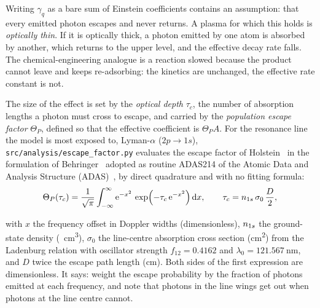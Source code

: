 Writing $\gamma_q$ as a bare sum of Einstein coefficients contains an
assumption: that every emitted photon escapes and never returns. A plasma for
which this holds is \emph{optically thin}. If it is optically thick, a photon
emitted by one atom is absorbed by another, which returns to the upper level,
and the effective decay rate falls. The chemical-engineering analogue is a
reaction slowed because the product cannot leave and keeps re-adsorbing:
the kinetics are unchanged, the effective rate constant is not.

The size of the effect is set by the \emph{optical depth} $\tau_c$, the number of
absorption lengths a photon must cross to escape, and carried by the
\emph{population escape factor} $\Theta_P$, defined so that the effective
coefficient is $\Theta_P A$. For the resonance line the model is most exposed
to, Lyman-$\alpha$ ($2p \to 1s$), \texttt{src/analysis/escape\_factor.py}
evaluates the escape factor of Holstein~\cite{Holstein1947} in the formulation
of Behringer~\cite{Behringer1998} adopted as routine ADAS214 of the Atomic Data
and Analysis Structure (ADAS)~\cite{Summers2006}, by direct quadrature and with
no fitting formula:
\begin{equation}
  \Theta_P(\tau_c)
  = \frac{1}{\sqrt{\pi}}\int_{-\infty}^{\infty}
    \mathrm{e}^{-x^{2}}\,
    \exp\!\left(-\tau_c\,\mathrm{e}^{-x^{2}}\right)\mathrm{d}x,
  \qquad
  \tau_c = n_{1s}\,\sigma_0\,\frac{D}{2},
  \label{eq:escape}
\end{equation}

\noindent with $x$ the frequency offset in Doppler widths (dimensionless),
$n_{1s}$ the ground-state density (\si{\per\cubic\centi\metre}), $\sigma_0$ the
line-centre absorption cross section (\si{\square\centi\metre}) from the
Ladenburg relation with oscillator strength $f_{12} = 0.4162$ and
$\lambda_0 = \SI{121.567}{\nano\metre}$, and $D$ twice the escape path length
(\si{\centi\metre}). Both sides of the first expression are dimensionless.
It says: weight the escape probability by the fraction of photons emitted at
each frequency, and note that photons in the line wings get out when photons at
the line centre cannot.

